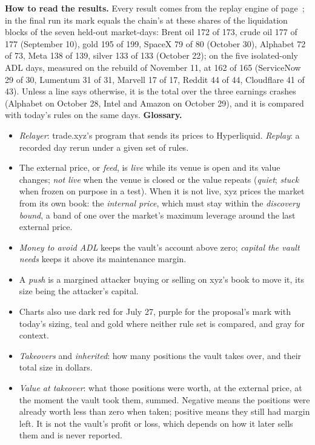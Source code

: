 \documentclass[10.5pt,a4paper]{article}
\begin{document}
\label{sec:appintro}\textbf{How to read the results.} Every result comes from the replay engine of page~\pageref{sec:tests}; in the final run its mark equals the chain's at these shares of the liquidation blocks of the seven held-out market-days: Brent oil 172 of 173, crude oil 177 of 177 (September 10), gold 195 of 199, SpaceX 79 of 80 (October 30), Alphabet 72 of 73, Meta 138 of 139, silver 133 of 133 (October 22); on the five isolated-only ADL days, measured on the rebuild of November 11, at 162 of 165 (ServiceNow 29 of 30, Lumentum 31 of 31, Marvell 17 of 17, Reddit 44 of 44, Cloudflare 41 of 43). Unless a line says otherwise, it is the total over the three earnings crashes (Alphabet on October 28, Intel and Amazon on October 29), and it is compared with today's rules on the same days. \textbf{Glossary.}
\begin{itemize}[leftmargin=1.2em,itemsep=0pt,topsep=.2ex]
\item {}\label{sec:glossary}\emph{Relayer}: trade.xyz's program that sends its prices to Hyperliquid. \emph{Replay}: a recorded day rerun under a given set of rules.
\item The external price, or \emph{feed}, is \emph{live} while its venue is open and its value changes; \emph{not live} when the venue is closed or the value repeats (\emph{quiet}; \emph{stuck} when frozen on purpose in a test). When it is not live, xyz prices the market from its own book: the \emph{internal price}, which must stay within the \emph{discovery bound}, a band of one over the market's maximum leverage around the last external price.
\item \emph{Money to avoid ADL} keeps the vault's account above zero; \emph{capital the vault needs} keeps it above its maintenance margin.
\item A \emph{push} is a margined attacker buying or selling on xyz's book to move it, its size being the attacker's capital.
\item Charts also use dark red for July 27, purple for the proposal's mark with today's sizing, teal and gold where neither rule set is compared, and gray for context.
\item \emph{Takeovers} and \emph{inherited}: how many positions the vault takes over, and their total size in dollars.
\item \emph{Value at takeover}: what those positions were worth, at the external price, at the moment the vault took them, summed. Negative means the positions were already worth less than zero when taken; positive means they still had margin left. It is not the vault's profit or loss, which depends on how it later sells them and is never reported.

\end{itemize}
\end{document}
